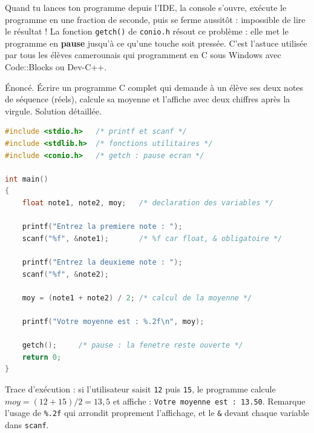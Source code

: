\documentclass[11pt]{article}
\begin{document}
\begin{savaistu}
Quand tu lances ton programme depuis l'IDE, la console s'ouvre, exécute le programme en une fraction de seconde, puis se ferme aussitôt : impossible de lire le résultat ! La fonction \texttt{getch()} de \texttt{conio.h} résout ce problème : elle met le programme en \textbf{pause} jusqu'à ce qu'une touche soit pressée. C'est l'astuce utilisée par tous les élèves camerounais qui programment en C sous Windows avec Code::Blocks ou Dev-C++.
\end{savaistu}

\begin{exoresolu}
Énoncé. Écrire un programme C complet qui demande à un élève ses deux notes de séquence (réels), calcule sa moyenne et l'affiche avec deux chiffres après la virgule.
\tcblower
Solution détaillée.
\begin{lstlisting}[language=C]
#include <stdio.h>   /* printf et scanf */
#include <stdlib.h>  /* fonctions utilitaires */
#include <conio.h>   /* getch : pause ecran */

int main()
{
    float note1, note2, moy;   /* declaration des variables */

    printf("Entrez la premiere note : ");
    scanf("%f", &note1);       /* %f car float, & obligatoire */

    printf("Entrez la deuxieme note : ");
    scanf("%f", &note2);

    moy = (note1 + note2) / 2; /* calcul de la moyenne */

    printf("Votre moyenne est : %.2f\n", moy);

    getch();     /* pause : la fenetre reste ouverte */
    return 0;
}
\end{lstlisting}
Trace d'exécution : si l'utilisateur saisit \texttt{12} puis \texttt{15}, le programme calcule $moy = (12 + 15) / 2 = 13{,}5$ et affiche : \texttt{Votre moyenne est : 13.50}. Remarque l'usage de \texttt{\%.2f} qui arrondit proprement l'affichage, et le \texttt{\&} devant chaque variable dans \texttt{scanf}.
\end{exoresolu}
\end{document}
